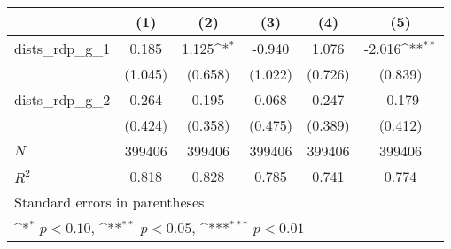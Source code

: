 {
\def\sym#1{\ifmmode^{#1}\else\(^{#1}\)\fi}
\begin{tabular}{l*{5}{c}}
\hline\hline
          &\multicolumn{1}{c}{(1)}         &\multicolumn{1}{c}{(2)}         &\multicolumn{1}{c}{(3)}         &\multicolumn{1}{c}{(4)}         &\multicolumn{1}{c}{(5)}         \\
\hline
dists\_rdp\_g\_1&    0.185         &    1.125\sym{*}  &   -0.940         &    1.076         &   -2.016\sym{**} \\
          &  (1.045)         &  (0.658)         &  (1.022)         &  (0.726)         &  (0.839)         \\
[1em]
dists\_rdp\_g\_2&    0.264         &    0.195         &    0.068         &    0.247         &   -0.179         \\
          &  (0.424)         &  (0.358)         &  (0.475)         &  (0.389)         &  (0.412)         \\
\hline
\(N\)     &   399406         &   399406         &   399406         &   399406         &   399406         \\
\(R^{2}\) &    0.818         &    0.828         &    0.785         &    0.741         &    0.774         \\
\hline\hline
\multicolumn{6}{l}{\footnotesize Standard errors in parentheses}\\
\multicolumn{6}{l}{\footnotesize \sym{*} \(p<0.10\), \sym{**} \(p<0.05\), \sym{***} \(p<0.01\)}\\
\end{tabular}
}
